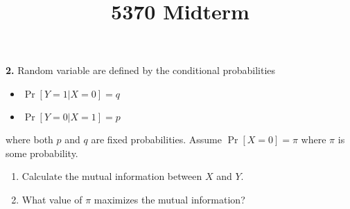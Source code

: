 \documentclass{assignment}
\begin{document}
\title{5370 Midterm}


\textbf{2.} Random variable are defined by the conditional probabilities
\begin{itemize}
\item  $\Pr[Y=1 | X=0] =q$
\item  $\Pr[Y=0 | X=1]=p$
\end{itemize}
where both $p$ and $q$ are fixed probabilities.
Assume $\Pr [X=0] =\pi $ where $\pi$ is some probability.
\begin{enumerate}
\item Calculate the mutual information between $X$ and $Y$.
\item What value of $\pi$ maximizes the mutual information?
\end{enumerate}
\end{document}
